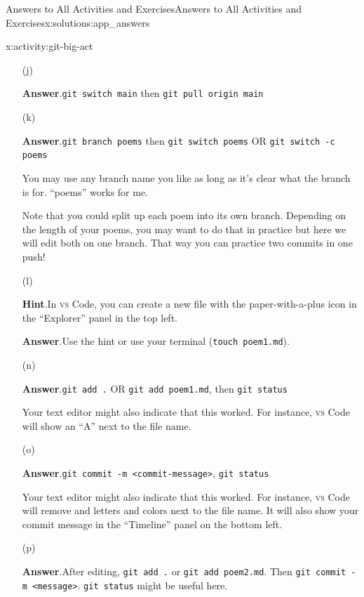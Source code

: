 \documentclass[oneside,10pt,]{book}
\newcommand{\blocktitlefont}{\relax}
\newcommand{\mono}[1]{\texttt{#1}}
\newcommand{\initialism}[1]{\textsc{\MakeLowercase{#1}}}
\begin{document}
\begin{solutions-chapter}{Answers to All Activities and Exercises}{}{Answers to All Activities and Exercises}{}{}{x:solutions:app_answers}
\begin{activitysolution}{4.11}{}{x:activity:git-big-act}
\begin{enumerate}[font=\bfseries,label=(\alph*),ref=\alph*]
\item[(j)]\par\smallskip%
\noindent\textbf{\blocktitlefont Answer}.\hypertarget{g:answer:idp616547128-back}{}\quad{}\mono{git switch main} then \mono{git pull origin main}%
\item[(k)]\par\smallskip%
\noindent\textbf{\blocktitlefont Answer}.\hypertarget{g:answer:idp616553016-back}{}\quad{}\mono{git branch poems} then \mono{git switch poems} OR \mono{git switch -c poems}%
\par
You may use any branch name you like as long as it's clear what the branch is for. ``poems'' works for me.%
\par
Note that you could split up each poem into its own branch. Depending on the length of your poems, you may want to do that in practice but here we will edit both on one branch. That way you can practice two commits in one push!%
\item[(l)]\par\smallskip%
\noindent\textbf{\blocktitlefont Hint}.\hypertarget{g:hint:idp616551992-back}{}\quad{}In \initialism{VS} Code, you can create a new file with the paper-with-a-plus icon in the ``Explorer'' panel in the top left.%
\par\smallskip%
\noindent\textbf{\blocktitlefont Answer}.\hypertarget{g:answer:idp616553528-back}{}\quad{}Use the hint or use your terminal (\mono{touch poem1.md}).%
\item[(n)]\par\smallskip%
\noindent\textbf{\blocktitlefont Answer}.\hypertarget{g:answer:idp616552376-back}{}\quad{}\mono{git add .} OR \mono{git add poem1.md}, then \mono{git status}%
\par
Your text editor might also indicate that this worked. For instance, \initialism{VS} Code will show an ``A'' next to the file name.%
\item[(o)]\par\smallskip%
\noindent\textbf{\blocktitlefont Answer}.\hypertarget{g:answer:idp616566968-back}{}\quad{}\mono{git commit -m \textquotedbl{}<commit-message>\textquotedbl{}}, \mono{git status}%
\par
Your text editor might also indicate that this worked. For instance, \initialism{VS} Code will remove and letters and colors next to the file name. It will also show your commit message in the ``Timeline'' panel on the bottom left.%
\item[(p)]\par\smallskip%
\noindent\textbf{\blocktitlefont Answer}.\hypertarget{g:answer:idp616562360-back}{}\quad{}After editing, \mono{git add .} or \mono{git add poem2.md}. Then \mono{git commit -m \textquotedbl{}<message>\textquotedbl{}}. \mono{git status} might be useful here.%

\end{enumerate}
\end{activitysolution}
\end{solutions-chapter}
\end{document}
